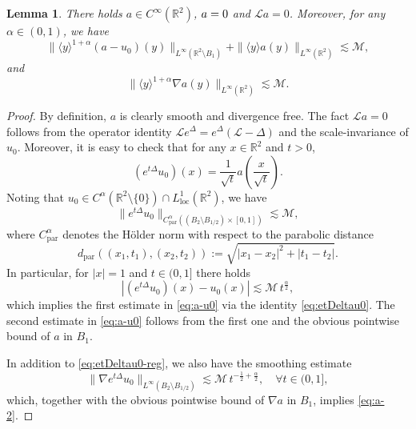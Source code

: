 \documentclass[12pt,reqno]{amsart}
\theoremstyle{plain}
\newtheorem{lemma}[theorem]{Lemma}
\theoremstyle{definition}
\newcommand{\R}{\mathbb{R}}
\newcommand{\M}{\mathcal{M}}
\renewcommand{\:}{\colon}
\let\div\relax
\DeclareMathOperator{\div}{div}
\numberwithin{equation}{section}
\numberwithin{figure}{section}
\begin{document}
\begin{lemma} \label{lem:a}
	There holds $a \in C^\infty(\R^2)$, $\div a = 0$ and $\mathcal{L} a = 0$. Moreover, for any $\alpha \in (0,1)$, we have
	\begin{equation} \label{eq:a-u0}
		  \|\langle y \rangle^{1+\alpha}(a-u_0)(y) \|_{L^\infty(\R^2 \setminus B_1)} + \|\langle y \rangle a(y)\|_{L^\infty(\R^2)}  \lesssim \M,
	\end{equation}
	and
	\begin{equation} \label{eq:a-2}
		 \| \langle y \rangle^{1+\alpha} \nabla a(y)\|_{L^\infty(\R^2)} \lesssim \M.
	\end{equation}
\end{lemma}
\begin{proof}
	By definition, $a$ is clearly smooth and divergence free.  The fact $\mathcal{L} a = 0$ follows from the operator identity $\mathcal{L} e^\Delta = e^\Delta ( \mathcal{L} - \Delta)$ and the scale-invariance of $u_0$. Moreover, it is easy to check that for any $x\in \R^2$ and $t>0$,
	\begin{equation} \label{eq:etDeltau0}
		(e^{t\Delta} u_0) (x) = \frac{1}{\sqrt{t}} a\left( \frac{x}{\sqrt{t}} \right).
	\end{equation} 
	Noting that $u_0 \in C^\alpha(\R^2 \setminus \{0\}) \cap L^1_{\text{loc}}(\R^2)$, we have
	\begin{equation} \label{eq:etDeltau0-reg}
		\|e^{t\Delta} u_0\|_{C^\alpha_{\text{par}}((B_2 \setminus B_{1/2}) \times [0,1])} \lesssim \M,
	\end{equation}
	where $C^\alpha_{\text{par}}$ denotes the H\"older norm with respect to the parabolic distance
	\begin{equation*}
		d_{\text{par}}((x_1,t_1),(x_2, t_2)) :=\sqrt{ |x_1-x_2|^2 + |t_1-t_2|}.
	\end{equation*}
	In particular, for $|x| = 1$ and $t \in (0,1]$ there holds
	\begin{equation}
		\left|(e^{t\Delta} u_0) (x) - u_0(x)\right| \lesssim  \M \, t^{\frac{\alpha}{2}},
	\end{equation}
	which implies the first estimate in \eqref{eq:a-u0} via the identity \eqref{eq:etDeltau0}. The second estimate in \eqref{eq:a-u0} follows from the first one and the obvious  pointwise bound of $a$ in $B_1$. 
	
	In addition to \eqref{eq:etDeltau0-reg}, we also have the smoothing estimate
		\begin{equation} \label{eq:etDeltau0-reg-2}
		\|\nabla  e^{t\Delta} u_0\|_{L^\infty(B_2 \setminus B_{1/2})} \lesssim \M \, t^{-\frac12+\frac{\alpha}{2}}, \quad \forall t \in (0,1],
	\end{equation}
	which, together with the obvious  pointwise bound of $\nabla a$ in $B_1$, implies  \eqref{eq:a-2}.
	
\end{proof}
\end{document}
